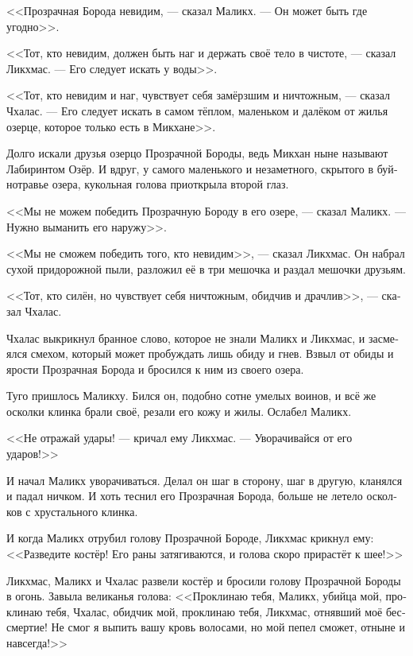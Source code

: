 \documentclass[a4paper,12pt,fleqn]{book}\usepackage{cooltooltips}\usepackage{polyglossia}\setdefaultlanguage[babelshorthands=true]{russian}\setotherlanguage{english}\defaultfontfeatures{Ligatures=TeX,Mapping=tex-text} \usepackage{xcolor}\definecolor{lightgray}{HTML}{bbbbbb}\color{lightgray}\newcommand{\ml}[3]{\textenglish{\textcolor{black}{#3}}}
\newcommand{\textspace}{\vspace{1em}{\centering\Large\bfseries<...>\par}\vspace{1em}}
\begin{document}
{\textspace

<<Прозрачная Борода невидим, --- сказал Маликх.
--- Он может быть где угодно>>.

<<Тот, кто невидим, должен быть наг и держать своё тело в чистоте, --- сказал Ликхмас.
--- Его следует искать у воды>>.

<<Тот, кто невидим и наг, чувствует себя замёрзшим и ничтожным, --- сказал Чхалас.
--- Его следует искать в самом тёплом, маленьком и далёком от жилья озерце, которое только есть в Микхане>>.

Долго искали друзья озерцо Прозрачной Бороды, ведь Микхан ныне называют Лабиринтом Озёр.
И вдруг, у самого маленького и незаметного, скрытого в буйнотравье озера, кукольная голова приоткрыла второй глаз.

<<Мы не можем победить Прозрачную Бороду в его озере, --- сказал Маликх.
--- Нужно выманить его наружу>>.

<<Мы не сможем победить того, кто невидим>>, --- сказал Ликхмас.
Он набрал сухой придорожной пыли, разложил её в три мешочка и раздал мешочки друзьям.

<<Тот, кто силён, но чувствует себя ничтожным, обидчив и драчлив>>, --- сказал Чхалас.

Чхалас выкрикнул бранное слово, которое не знали Маликх и Ликхмас, и засмеялся смехом, который может пробуждать лишь обиду и гнев.
Взвыл от обиды и ярости Прозрачная Борода и бросился к ним из своего озера.

\textspace

Туго пришлось Маликху.
Бился он, подобно сотне умелых воинов, и всё же осколки клинка брали своё, резали его кожу и жилы.
Ослабел Маликх.

<<Не отражай удары! --- кричал ему Ликхмас.
--- Уворачивайся от его ударов!>>

И начал Маликх уворачиваться.
Делал он шаг в сторону, шаг в другую, кланялся и падал ничком.
И хоть теснил его Прозрачная Борода, больше не летело осколков с хрустального клинка.

\textspace

И когда Маликх отрубил голову Прозрачной Бороде, Ликхмас крикнул ему:
<<Разведите костёр!
Его раны затягиваются, и голова скоро прирастёт к шее!>>

Ликхмас, Маликх и Чхалас развели костёр и бросили голову Прозрачной Бороды в огонь.
Завыла великанья голова:
<<Проклинаю тебя, Маликх, убийца мой, проклинаю тебя, Чхалас, обидчик мой, проклинаю тебя, Ликхмас, отнявший моё бессмертие!
Не смог я выпить вашу кровь волосами, но мой пепел сможет, отныне и навсегда!>>

}
\end{document}
